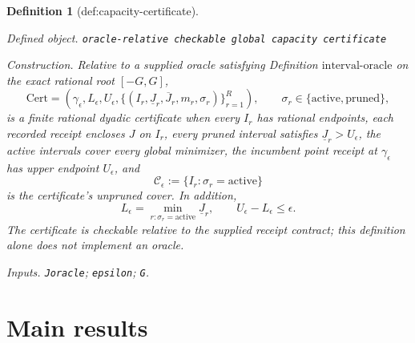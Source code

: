 \documentclass{article}
\newtheorem{definition}{Definition}
\begin{document}
\begin{definition}[def:capacity-certificate]\label{def:capacity-certificate}
\par\smallskip\noindent\emph{Defined object.} \texttt{oracle-\allowbreak{}relative checkable global capacity certificate}
\par\smallskip\noindent\emph{Construction.} Relative to a supplied oracle satisfying Definition \(\mathrm{interval\mbox{-}oracle}\) on the exact rational root \([-G,G]\),
\[
 \mathrm{Cert}=(\gamma_\epsilon,L_\epsilon,U_\epsilon,
 \{(I_r,\underline J_r,\overline J_r,m_r,\sigma_r)\}_{r=1}^R),
 \qquad \sigma_r\in\{\mathrm{active},\mathrm{pruned}\},
\]
is a finite rational dyadic certificate when every \(I_r\) has rational endpoints, each recorded receipt encloses \(J\) on \(I_r\), every pruned interval satisfies \(\underline J_r>U_\epsilon\), the active intervals cover every global minimizer, the incumbent point receipt at \(\gamma_\epsilon\) has upper endpoint \(U_\epsilon\), and
\[
 \mathcal C_\epsilon:=\{I_r:\sigma_r=\mathrm{active}\}
\]
is the certificate's unpruned cover.  In addition,
\[
 L_\epsilon=\min_{r:\sigma_r=\mathrm{active}}\underline J_r,
 \qquad U_\epsilon-L_\epsilon\leq\epsilon.
\]
The certificate is checkable relative to the supplied receipt contract; this definition alone does not implement an oracle.
\par\smallskip\noindent\emph{Inputs.} \texttt{Joracle}; \texttt{epsilon}; \texttt{G}.
\end{definition}

\section{Main results}
\end{document}
